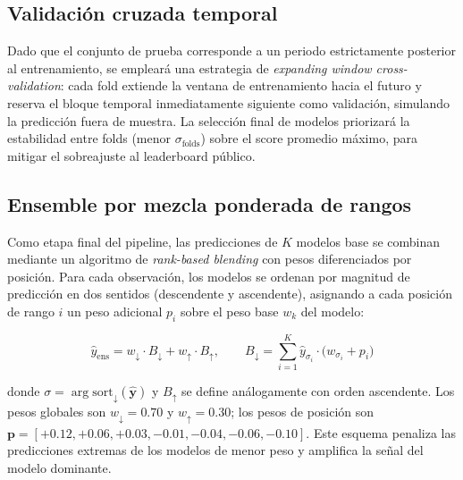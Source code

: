 \documentclass{article}
\begin{document}
\subsection{Validación cruzada temporal}

Dado que el conjunto de prueba corresponde a un periodo estrictamente posterior al entrenamiento, se empleará una estrategia de \emph{expanding window cross-validation}: cada fold extiende la ventana de entrenamiento hacia el futuro y reserva el bloque temporal inmediatamente siguiente como validación, simulando la predicción fuera de muestra. La selección final de modelos priorizará la estabilidad entre folds (menor $\sigma_{\text{folds}}$) sobre el score promedio máximo, para mitigar el sobreajuste al leaderboard público.


\subsection{Ensemble por mezcla ponderada de rangos}

Como etapa final del pipeline, las predicciones de $K$ modelos base se combinan mediante un algoritmo de \emph{rank-based blending} con pesos diferenciados por posición. Para cada observación, los modelos se ordenan por magnitud de predicción en dos sentidos (descendente y ascendente), asignando a cada posición de rango $i$ un peso adicional $p_i$ sobre el peso base $w_k$ del modelo:

\begin{equation}
  \hat{y}_{\text{ens}} = w_{\downarrow} \cdot B_{\downarrow} + w_{\uparrow} \cdot B_{\uparrow}, \qquad
  B_{\downarrow} = \sum_{i=1}^{K} \hat{y}_{\sigma_i} \cdot \bigl(w_{\sigma_i} + p_i\bigr)
  \label{eq:ensemble}
\end{equation}

donde $\sigma = \arg\mathrm{sort}_{\downarrow}(\hat{\mathbf{y}})$ y $B_{\uparrow}$ se define análogamente con orden ascendente. Los pesos globales son $w_{\downarrow} = 0.70$ y $w_{\uparrow} = 0.30$; los pesos de posición son $\mathbf{p} = [+0.12, +0.06, +0.03, -0.01, -0.04, -0.06, -0.10]$. Este esquema penaliza las predicciones extremas de los modelos de menor peso y amplifica la señal del modelo dominante.


\end{document}
